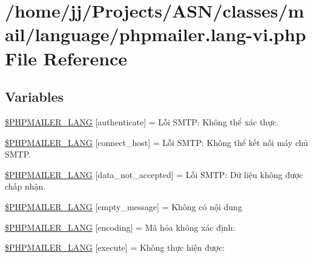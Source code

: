 \hypertarget{phpmailer_8lang-vi_8php}{}\section{/home/jj/\+Projects/\+A\+S\+N/classes/mail/language/phpmailer.lang-\/vi.php File Reference}
\label{phpmailer_8lang-vi_8php}
\subsection*{Variables}
\begin{DoxyCompactItemize}
\item 
\hyperlink{phpmailer_8lang-vi_8php_a2cb33073c989b85580748e331ed8b4aa}{\$\+P\+H\+P\+M\+A\+I\+L\+E\+R\+\_\+\+L\+A\+NG} \mbox{[}\textquotesingle{}authenticate\textquotesingle{}\mbox{]} = \textquotesingle{}Lỗi S\+M\+T\+P\+: Không thể xác thực.\textquotesingle{}
\item 
\hyperlink{phpmailer_8lang-vi_8php_a2ee0cc637a06b96e45600db31c6799ee}{\$\+P\+H\+P\+M\+A\+I\+L\+E\+R\+\_\+\+L\+A\+NG} \mbox{[}\textquotesingle{}connect\+\_\+host\textquotesingle{}\mbox{]} = \textquotesingle{}Lỗi S\+M\+T\+P\+: Không thể kết nối máy chủ S\+M\+T\+P.\textquotesingle{}
\item 
\hyperlink{phpmailer_8lang-vi_8php_a814c6b191205d2361b3233e9c9d6fda5}{\$\+P\+H\+P\+M\+A\+I\+L\+E\+R\+\_\+\+L\+A\+NG} \mbox{[}\textquotesingle{}data\+\_\+not\+\_\+accepted\textquotesingle{}\mbox{]} = \textquotesingle{}Lỗi S\+M\+T\+P\+: Dữ liệu không được chấp nhận.\textquotesingle{}
\item 
\hyperlink{phpmailer_8lang-vi_8php_a33772099f637c9d6c2cd7425e0e37fed}{\$\+P\+H\+P\+M\+A\+I\+L\+E\+R\+\_\+\+L\+A\+NG} \mbox{[}\textquotesingle{}empty\+\_\+message\textquotesingle{}\mbox{]} = \textquotesingle{}Không có nội dung\textquotesingle{}
\item 
\hyperlink{phpmailer_8lang-vi_8php_a817f7283f3d54c970a0c10305cc668cc}{\$\+P\+H\+P\+M\+A\+I\+L\+E\+R\+\_\+\+L\+A\+NG} \mbox{[}\textquotesingle{}encoding\textquotesingle{}\mbox{]} = \textquotesingle{}Mã hóa không xác định\+: \textquotesingle{}
\item 
\hyperlink{phpmailer_8lang-vi_8php_a668217a9563a168f30f2a8548b6ed5a9}{\$\+P\+H\+P\+M\+A\+I\+L\+E\+R\+\_\+\+L\+A\+NG} \mbox{[}\textquotesingle{}execute\textquotesingle{}\mbox{]} = \textquotesingle{}Không thực hiện được\+: \textquotesingle{}
\item 

\end{DoxyCompactItemize}
